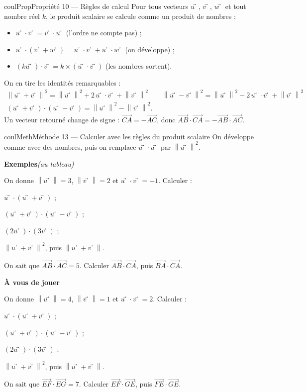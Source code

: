 \documentclass[11pt,a4paper]{article}
\makeatletter
\newcommand{\vect}[1]{\overrightarrow{#1}}
\newcommand{\norme}[1]{\left\lVert #1 \right\rVert}
\newcounter{lycee@signet}
\newcommand{\signet}[3][]{\stepcounter{lycee@signet}%
  \edef\lycee@dest{\if\relax\detokenize{#1}\relax
    signet.\arabic{lycee@signet}\else#1\fi}%
  \hypertarget{\lycee@dest}{}\bookmark[level=#2,dest=\lycee@dest]{#3}}
\def\vec#1{#1⃗}}%
\newcounter{methode}
\newenvironment{proprietebox}[1][Propriété]%
  {\begin{boitecours}[phantom={\signet{2}{#1}}]{coulProp}{#1}}{\end{boitecours}}
\newenvironment{methodebox}[1][Méthode]{\stepcounter{methode}%
  \begin{boitecours}[phantom={\signet[methode-\arabic{methode}]{2}{#1}}]{coulMeth}{#1}}%
  {\end{boitecours}}
\newcommand{\etape}[1]{\par\smallskip\textbf{\color{coulMeth}#1}\par\nobreak\smallskip}
\newcommand{\autableau}{\hfill{\footnotesize\itshape\color{black!45}(au tableau)}}
\newcommand{\etapeexemples}{%
    \par\smallskip\textbf{\color{coulMeth}Exemples}\autableau\par\nobreak\smallskip}
\makeatother
\begin{document}
\begin{proprietebox}[Propriété 10 --- Règles de calcul]
Pour tous vecteurs $\vec{u}$, $\vec{v}$, $\vec{w}$ et tout nombre réel $k$, le produit
scalaire se calcule comme un produit de nombres :
\begin{itemize}
  \item $\vec{u}\cdot\vec{v}=\vec{v}\cdot\vec{u}$ (l'ordre ne compte pas) ;
  \item $\vec{u}\cdot(\vec{v}+\vec{w})=\vec{u}\cdot\vec{v}+\vec{u}\cdot\vec{w}$
        (on développe) ;
  \item $(k\vec{u})\cdot\vec{v}=k\times(\vec{u}\cdot\vec{v})$ (les nombres sortent).
\end{itemize}
On en tire les identités remarquables :
\begin{gather*}
  \norme{\vec{u}+\vec{v}}^{2}=\norme{\vec{u}}^{2}+2\,\vec{u}\cdot\vec{v}+\norme{\vec{v}}^{2}
  \qquad
  \norme{\vec{u}-\vec{v}}^{2}=\norme{\vec{u}}^{2}-2\,\vec{u}\cdot\vec{v}+\norme{\vec{v}}^{2}\\
  (\vec{u}+\vec{v})\cdot(\vec{u}-\vec{v})=\norme{\vec{u}}^{2}-\norme{\vec{v}}^{2}.
\end{gather*}
Un vecteur retourné change de signe : $\vect{CA}=-\vect{AC}$, donc
$\vect{AB}\cdot\vect{CA}=-\vect{AB}\cdot\vect{AC}$.
\end{proprietebox}

\begin{methodebox}[Méthode 13 --- Calculer avec les règles du produit scalaire]
On développe comme avec des nombres, puis on remplace $\vec{u}\cdot\vec{u}$ par
$\norme{\vec{u}}^{2}$.
\etapeexemples
On donne $\norme{\vec{u}}=3$, $\norme{\vec{v}}=2$ et $\vec{u}\cdot\vec{v}=-1$. Calculer :
\begin{questions}[label=\alph*)]
  \item $\vec{u}\cdot(\vec{u}+\vec{v})$ ;
  \item $(\vec{u}+\vec{v})\cdot(\vec{u}-\vec{v})$ ;
  \item $(2\vec{u})\cdot(3\vec{v})$ ;
  \item $\norme{\vec{u}+\vec{v}}^{2}$, puis $\norme{\vec{u}+\vec{v}}$.
  \item On sait que $\vect{AB}\cdot\vect{AC}=5$. Calculer $\vect{AB}\cdot\vect{CA}$, puis
        $\vect{BA}\cdot\vect{CA}$.
\end{questions}

\etape{À vous de jouer}
On donne $\norme{\vec{u}}=4$, $\norme{\vec{v}}=1$ et $\vec{u}\cdot\vec{v}=2$. Calculer :
\begin{questions}[label=\alph*)]
  \item $\vec{u}\cdot(\vec{u}+\vec{v})$ ;
  \item $(\vec{u}+\vec{v})\cdot(\vec{u}-\vec{v})$ ;
  \item $(2\vec{u})\cdot(3\vec{v})$ ;
  \item $\norme{\vec{u}+\vec{v}}^{2}$, puis $\norme{\vec{u}+\vec{v}}$.
  \item On sait que $\vect{EF}\cdot\vect{EG}=7$. Calculer $\vect{EF}\cdot\vect{GE}$, puis
        $\vect{FE}\cdot\vect{GE}$.
\end{questions}

\end{methodebox}
\end{document}
